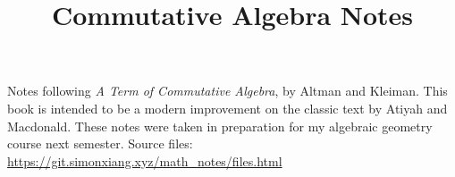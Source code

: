 \documentclass[fontsize=9pt]{article}
\title{Commutative Algebra Notes}
\begin{document}
\maketitle
Notes following \emph{A Term of Commutative Algebra}, by Altman and Kleiman. This book is intended to be a modern improvement on the classic text by Atiyah and Macdonald. These notes were taken in preparation for my algebraic geometry course next semester. Source files: \url{https://git.simonxiang.xyz/math_notes/files.html}

\tableofcontents
    
\end{document}
